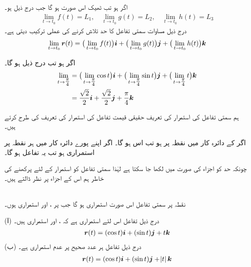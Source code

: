 اگر  ہو تب  ٹھیک اس صورت ہو گا جب درج ذیل ہو۔
\begin{align*}
\lim_{t\to t_0}f(t)=L_1,\quad \lim_{t\to t_0}g(t)=L_2,\quad \lim_{t\to t_0}h(t)=L_3
\end{align*}
درج ذیل مساوات سمتی تفاعل کا حد تلاش کرنے کی  عملی ترکیب دیتی ہے۔
\begin{align}
\lim_{t\to t_0}{{\boldsymbol{r}}}(t)=\big(\lim_{t\to t_0}f(t)\big){\boldsymbol{i}}+\big(\lim_{t\to t_0}g(t)\big){\boldsymbol{j}}+\big(\lim_{t\to t_0}h(t)\big){\boldsymbol{k}}
\end{align}


اگر  ہو تب درج ذیل ہو گا۔
\begin{align*}
\lim_{t\to \tfrac{\pi}{4}}&=\big(\lim_{t\to \tfrac{\pi}{4}}\cos t\big){\boldsymbol{i}}+\big(\lim_{t\to \tfrac{\pi}{4}}\sin t\big){\boldsymbol{j}}+\big(\lim_{t\to \tfrac{\pi}{4}}t\big){\boldsymbol{k}}\\
&=\frac{\sqrt{2}}{2}{\boldsymbol{i}}+\frac{\sqrt{2}}{2}{\boldsymbol{j}}+\frac{\pi}{4}{\boldsymbol{k}}
\end{align*}

ہم سمتی تفاعل کی استمرار کی تعریف  حقیقی قیمت تفاعل کی استمرار کی تعریف کی طرح کرتے ہیں۔

اگر  کے دائرہ کار میں نقطہ  پر     ہو تب    اس ہو گا۔ اگر  اپنے پورے دائرہ کار میں ہر نقطہ پر    استمراری ہو تب یہ تفاعل  ہو گا۔


چونکہ حد کو اجزاء کی صورت میں لکھا جا سکتا ہے لہٰذا  سمتی تفاعل کو استمرار کے لئے پرکھنے کی خاطر ہم اس  کے اجزاء  پر نظر ڈالتے ہیں۔

\\
نقطہ  پر سمتی  تفاعل   اس صورت استمراری ہو گا جب   پر ،  اور  استمراری ہوں۔

(ا) درج ذیل تفاعل اس لئے استمراری  ہے کہ ،  اور  استمراری ہیں۔
\begin{align*}
{\ensuremath{{\boldsymbol{r}}}}(t)=(\cos t){\boldsymbol{i}}+(\sin t){\boldsymbol{j}}+t {\boldsymbol{k}}
\end{align*}
(ب) درج ذیل  تفاعل ہر عدد صحیح پر  عدم استمراری ہے۔
\begin{align*}
{\ensuremath{{\boldsymbol{r}}}}(t)=(\cos t){\boldsymbol{i}}+(\sin t){\boldsymbol{j}}+\abs{t} {\boldsymbol{k}}
\end{align*}

